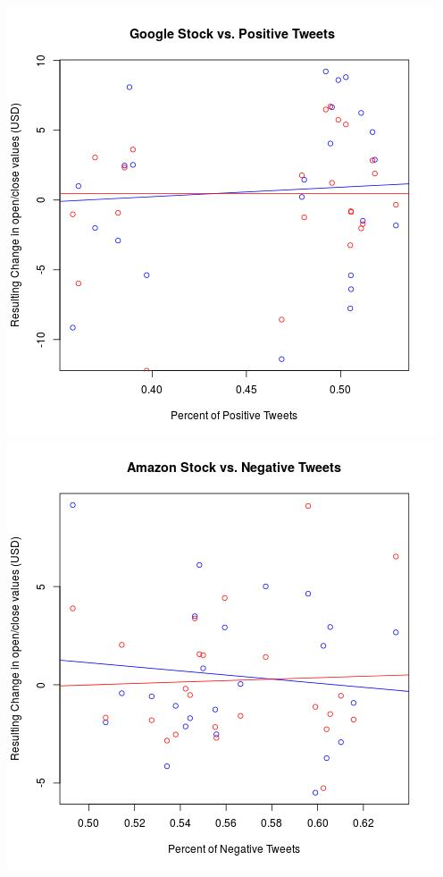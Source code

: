 \documentclass{acm_proc_article-sp}
\begin{document}
\begin{doublespace}
\newline\includegraphics[scale=.5]{google_positive.jpeg}\includegraphics[scale=.5]{amazon_negative.jpeg}

\end{doublespace}
\end{document}
